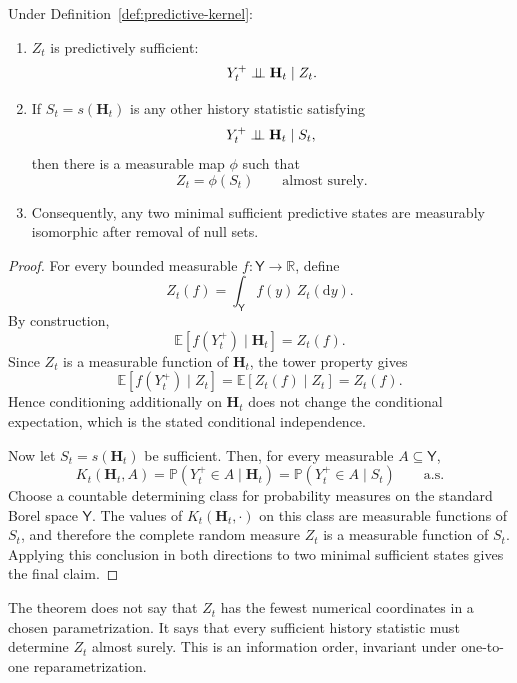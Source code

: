 \begin{theorem}
\label{thm:predictive-state}
Under Definition~\ref{def:predictive-kernel}:
\begin{enumerate}
\item \(Z_t\) is predictively sufficient:
\[
Y_t^+\perp\!\!\!\perp\mathbf H_t\mid Z_t.
\]
\item If \(S_t=s(\mathbf H_t)\) is any other history statistic satisfying
\[
Y_t^+\perp\!\!\!\perp\mathbf H_t\mid S_t,
\]
then there is a measurable map \(\phi\) such that
\[
Z_t=\phi(S_t)
\qquad\text{almost surely}.
\]
\item Consequently, any two minimal sufficient predictive states are
measurably isomorphic after removal of null sets.
\end{enumerate}
\end{theorem}

\begin{proof}
For every bounded measurable \(f:\mathsf Y\to\mathbb R\), define
\[
Z_t(f)=\int_{\mathsf Y}f(y)\,Z_t(\mathrm dy).
\]
By construction,
\[
\mathbb E[f(Y_t^+)\mid\mathbf H_t]=Z_t(f).
\]
Since \(Z_t\) is a measurable function of \(\mathbf H_t\), the tower property
gives
\[
\mathbb E[f(Y_t^+)\mid Z_t]
=
\mathbb E[Z_t(f)\mid Z_t]
=
Z_t(f).
\]
Hence conditioning additionally on \(\mathbf H_t\) does not change the
conditional expectation, which is the stated conditional independence.

Now let \(S_t=s(\mathbf H_t)\) be sufficient. Then, for every measurable
\(A\subseteq\mathsf Y\),
\[
K_t(\mathbf H_t,A)
=
\mathbb P(Y_t^+\in A\mid\mathbf H_t)
=
\mathbb P(Y_t^+\in A\mid S_t)
\qquad\text{a.s.}
\]
Choose a countable determining class for probability measures on the standard
Borel space \(\mathsf Y\). The values of \(K_t(\mathbf H_t,\cdot)\) on this
class are measurable functions of \(S_t\), and therefore the complete random
measure \(Z_t\) is a measurable function of \(S_t\). Applying this conclusion
in both directions to two minimal sufficient states gives the final claim.
\end{proof}

\begin{remark}
The theorem does not say that \(Z_t\) has the fewest numerical coordinates in
a chosen parametrization. It says that every sufficient history statistic
must determine \(Z_t\) almost surely. This is an information order, invariant
under one-to-one reparametrization.
\end{remark}

